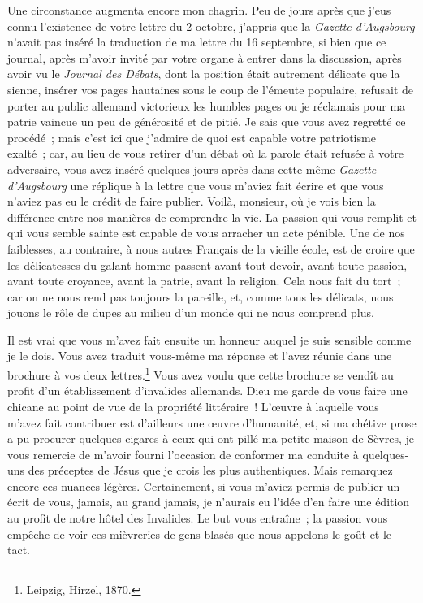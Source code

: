 \documentclass[french,twoside]{book} %
\begin{document}
Une circonstance augmenta encore mon chagrin. Peu de jours après que j’eus connu l’existence de votre lettre du 2 octobre, j’appris que la {\itshape Gazette d’Augsbourg} n’avait pas inséré la traduction de ma lettre du 16 septembre, si bien que ce journal, après m’avoir invité par votre organe à entrer dans la discussion, après avoir vu le {\itshape Journal des Débats}, dont la position était autrement délicate que la sienne, insérer vos pages hautaines sous le coup de l’émeute populaire, refusait de porter au public allemand victorieux les humbles pages ou je réclamais pour ma patrie vaincue un peu de générosité et de pitié. Je sais que vous avez regretté ce procédé ; mais c’est ici que j’admire de quoi est capable votre patriotisme exalté ; car, au lieu de vous retirer d’un débat où la parole était refusée à votre adversaire, vous avez inséré quelques jours après dans cette même {\itshape Gazette d’Augsbourg} une réplique à la lettre que vous m’aviez fait écrire et que vous n’aviez pas eu le crédit de faire publier. Voilà, monsieur, où je vois bien la différence entre nos manières de comprendre la vie. La passion qui vous remplit et qui vous semble sainte est capable de vous arracher un acte pénible. Une de nos faiblesses, au contraire, à nous autres Français de la vieille école, est de croire que les délicatesses du galant homme passent avant tout devoir, avant toute passion, avant toute croyance, avant la patrie, avant la religion. Cela nous fait du tort ; car on ne nous rend pas toujours la pareille, et, comme tous les délicats, nous jouons le rôle de dupes au milieu d’un monde qui ne nous comprend plus.\par
Il est vrai que vous m’avez fait ensuite un honneur auquel je suis sensible comme je le dois. Vous avez traduit vous-même ma réponse et l’avez réunie dans une brochure à vos deux lettres.\footnote{Leipzig, Hirzel, 1870.} Vous avez voulu que cette brochure se vendît au profit d’un établissement d’invalides allemands. Dieu me garde de vous faire une chicane au point de vue de la propriété littéraire ! L’œuvre à laquelle vous m’avez fait contribuer est d’ailleurs une œuvre d’humanité, et, si ma chétive prose a pu procurer quelques cigares à ceux qui ont pillé ma petite maison de Sèvres, je vous remercie de m’avoir fourni l’occasion de conformer ma conduite à quelques-uns des préceptes de Jésus que je crois les plus authentiques. Mais remarquez encore ces nuances légères. Certainement, si vous m’aviez permis de publier un écrit de vous, jamais, au grand jamais, je n’aurais eu l’idée d’en faire une édition au profit de notre hôtel des Invalides. Le but vous entraîne ; la passion vous empêche de voir ces mièvreries de gens blasés que nous appelons le goût et le tact.\par
\end{document}
